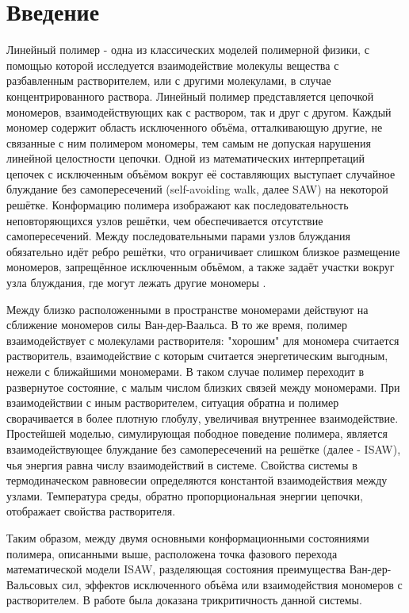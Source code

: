 \section{Введение}

\setcounter{page}{1}

Линейный полимер - одна из классических моделей полимерной физики, 
с помощью которой исследуется взаимодействие молекулы вещества с разбавленным растворителем, 
или с другими молекулами, в случае концентрированного раствора.
Линейный полимер представляется цепочкой мономеров, взаимодействующих как с раствором, так и друг с другом.
Каждый мономер содержит область исключенного объёма, отталкивающую другие, не связанные с ним полимером мономеры, 
тем самым не допуская нарушения линейной целостности цепочки.
Одной из математических интерпретаций цепочек с исключенным объёмом вокруг её составляющих выступает случайное блуждание без самопересечений (self-avoiding walk, далее SAW) на некоторой решётке.
Конформацию полимера изображают как последовательность неповторяющихся узлов решётки, чем обеспечивается отсутствие самопересечений.
Между последовательными парами узлов блуждания обязательно идёт ребро решётки, что ограничивает слишком близкое размещение мономеров, запрещённое исключенным объёмом, а также задаёт участки вокруг узла блуждания, где могут лежать другие мономеры \cite{Gennes1979, Vanderzande1998}.

Между близко расположенными в пространстве мономерами действуют на сближение мономеров
силы Ван-дер-Ваальса.
В то же время, полимер взаимодействует с молекулами растворителя:
"хорошим" для мономера считается растворитель, взаимодействие с которым считается энергетическим выгодным, нежели с ближайшими мономерами.
В таком случае полимер переходит в развернутое состояние, с малым числом близких связей между мономерами.
При взаимодействии с иным растворителем, ситуация обратна и полимер сворачивается в более плотную глобулу, увеличивая внутреннее взаимодействие.
Простейшей моделью, симулирующая пободное поведение полимера, является взаимодействующее блуждание без самопересечений на решётке
(далее - ISAW), чья энергия равна числу взаимодействий в системе. 
Свойства системы в термодиначеском равновесии определяются константой взаимодействия между узлами.
Температура среды, обратно пропорциональная энергии цепочки, отображает свойства растворителя.

Таким образом, между двумя основными конформационными состояниями полимера, описанными выше, 
расположена точка фазового перехода математической модели ISAW, разделяющая состояния преимущества Ван-дер-Вальсовых сил, эффектов исключенного объёма или взаимодействия мономеров с растворителем.
В работе \cite{Gennes1979} была доказана трикритичность данной системы.

